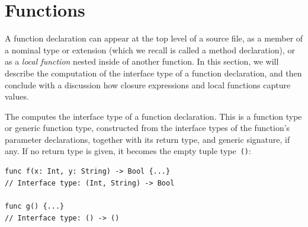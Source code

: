 \documentclass[../generics]{subfiles}
\begin{document}
\section{Functions}\label{sec:functions}

A function declaration can appear at the top level of a source file, as a member of a nominal type or extension (which we recall is called a method declaration), or as a \emph{local function} nested inside of another function. In this section, we will describe the computation of the interface type of a function declaration, and then conclude with a discussion how closure expressions and local functions capture values.

The  computes the interface type of a function declaration. This is a function type or generic function type, constructed from the interface types of the function's parameter declarations, together with its return type, and generic signature, if any. If no return type is given, it becomes the empty tuple type~\texttt{()}:
\begin{Verbatim}
func f(x: Int, y: String) -> Bool {...}
// Interface type: (Int, String) -> Bool

func g() {...}
// Interface type: () -> ()
\end{Verbatim}
\end{document}
